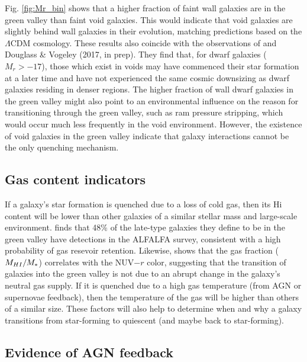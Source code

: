 Fig. \ref{fig:Mr_bin} shows that a higher fraction of faint wall galaxies are in 
the green valley than faint void galaxies.  This would indicate that void 
galaxies are slightly behind wall galaxies in their evolution, matching 
predictions based on the $\Lambda$CDM cosmology.  These results also coincide 
with the observations of \cite{Douglass17b} and Douglass \& Vogeley (2017, in 
prep).  They find that, for dwarf galaxies ($M_r > -17$), those which exist in 
voids may have commenced their star formation at a later time and have not 
experienced the same cosmic downsizing as dwarf galaxies residing in denser 
regions.  The higher fraction of wall dwarf galaxies in the green valley might 
also point to an environmental influence on the reason for transitioning through 
the green valley, such as ram pressure stripping, which would occur much less 
frequently in the void environment.  However, the existence of void galaxies in 
the green valley indicate that galaxy interactions cannot be the only quenching 
mechanism.


\subsection{Gas content indicators}

If a galaxy's star formation is quenched due to a loss of cold gas, then its 
H{\sc i} content will be lower than other galaxies of a similar stellar mass and 
large-scale environment.  \cite{Schawinski14} finds that 48\% of the late-type 
galaxies they define to be in the green valley have  detections in the 
ALFALFA survey, consistent with a high probability of gas resevoir retention.  
Likewise, \cite{Catinella12} shows that the gas fraction ($M_{\ion{H}{1}}/M_*$) 
correlates with the NUV$-r$ color, suggesting that the transition of galaxies 
into the green valley is not due to an abrupt change in the galaxy's neutral gas 
supply.  If it is quenched due to a high gas temperature (from AGN or supernovae 
feedback), then the temperature of the gas will be higher than others of a 
similar size.  These factors will also help to determine when and why a galaxy 
transitions from star-forming to quiescent (and maybe back to star-forming).


\subsection{Evidence of AGN feedback}

